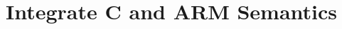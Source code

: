\documentclass[conference]{IEEEtran}
\begin{document}
%

\section{Integrate C and ARM Semantics}
\end{document}
